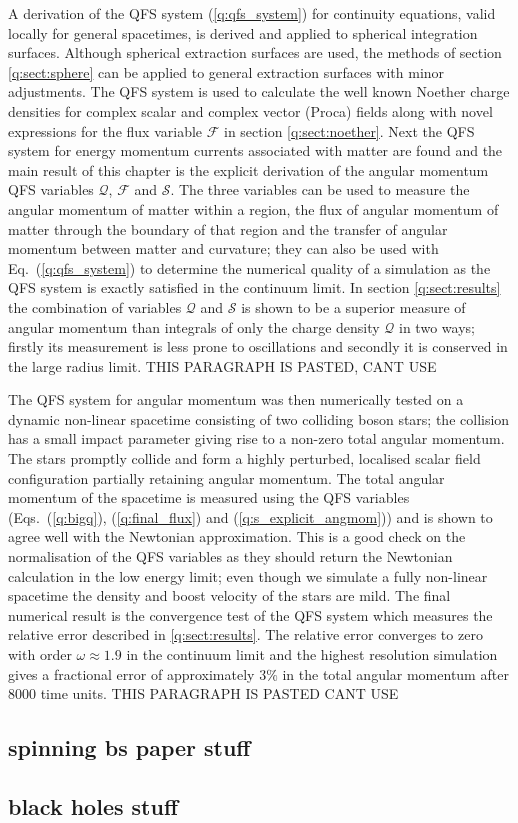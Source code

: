 A derivation of the QFS system (\ref{q:qfs_system}) for continuity equations,
valid locally for general spacetimes, is derived and applied to spherical integration
surfaces. Although spherical extraction surfaces are used, the methods of section
\ref{q:sect:sphere} can be applied to general extraction surfaces with minor adjustments.
The QFS system is used to calculate the well known Noether charge densities for
complex scalar and complex vector (Proca) fields along with novel expressions for
the flux variable $\mathcal{F}$ in section \ref{q:sect:noether}. Next the QFS system
for energy momentum currents associated with matter are found and the main result
of this chapter is the explicit derivation of the angular momentum QFS variables
$\mathcal{Q}$,  $\mathcal{F}$ and $\mathcal{S}$. The three variables can be used
to measure the angular momentum of matter within a region, the flux of angular
momentum of matter through the boundary of that region and the transfer of angular
momentum between matter and curvature; they can also be used with Eq.~(\ref{q:qfs_system})
to determine the numerical quality of a simulation as the QFS system is exactly
satisfied in the continuum limit. In section \ref{q:sect:results} the combination
of variables $\mathcal{Q}$ and $\mathcal{S}$ is shown to be a superior measure of
angular momentum than integrals of only the charge density $\mathcal{Q}$ in two
ways; firstly its measurement is less prone to oscillations and secondly it is
conserved in the large radius limit. THIS PARAGRAPH IS PASTED, CANT USE

The QFS system for angular momentum was then numerically tested on a dynamic non-linear
spacetime consisting of two colliding boson stars; the collision has a small impact
parameter giving rise to a non-zero total angular momentum. The stars promptly
collide and form a highly perturbed, localised scalar field configuration partially
retaining angular momentum. The total angular momentum of the spacetime is
measured using the QFS variables (Eqs.~(\ref{q:bigq}), (\ref{q:final_flux}) and
(\ref{q:s_explicit_angmom})) and is shown to agree well with the Newtonian
approximation. This is a good check on the normalisation of the QFS variables as
they should return the Newtonian calculation in the low energy limit; even though
we simulate a fully non-linear spacetime the density and boost velocity of the
stars are mild. The final numerical result is the convergence test of the QFS system
which measures the relative error described in \ref{q:sect:results}. The relative
error converges to zero with order $\omega\approx 1.9$ in the continuum limit
and the highest resolution simulation gives a fractional error of approximately
$3 \%$ in the total angular momentum after $8000$ time units. THIS PARAGRAPH IS PASTED CANT USE

\subsection{spinning bs paper stuff}

\subsection{black holes stuff}
